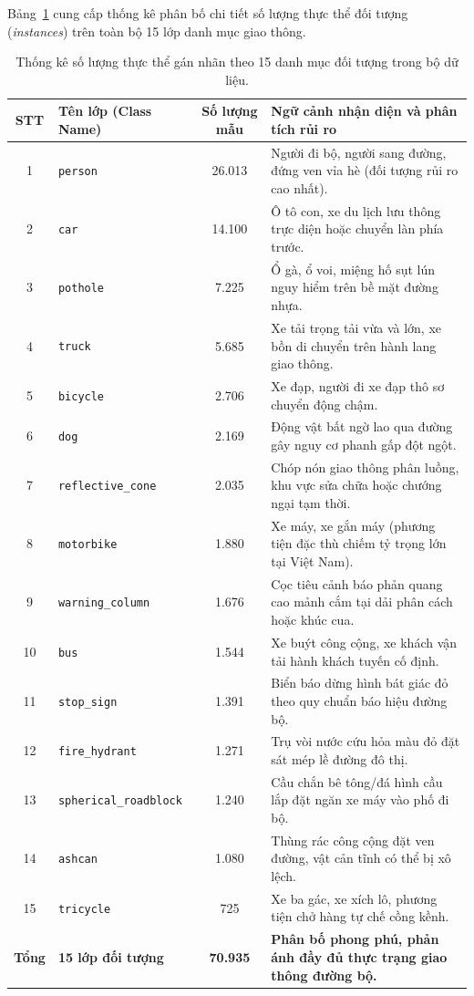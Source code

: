 \documentclass[12pt,a4paper]{article}
\begin{document}
Bảng~\ref{tab:class_instances_distribution} cung cấp thống kê phân bố chi tiết số lượng thực thể đối tượng (\textit{instances}) trên toàn bộ 15 lớp danh mục giao thông.

\begin{table}[htbp]
\centering
\caption{Thống kê số lượng thực thể gán nhãn theo 15 danh mục đối tượng trong bộ dữ liệu.}
\label{tab:class_instances_distribution}
\small
\begin{tabular}{|c|l|c|p{8.0cm}|}
\hline
\textbf{STT} & \textbf{Tên lớp (Class Name)} & \textbf{Số lượng mẫu} & \textbf{Ngữ cảnh nhận diện và phân tích rủi ro} \\ \hline
1 & \texttt{person} & 26.013 & Người đi bộ, người sang đường, đứng ven vỉa hè (đối tượng rủi ro cao nhất). \\ \hline
2 & \texttt{car} & 14.100 & Ô tô con, xe du lịch lưu thông trực diện hoặc chuyển làn phía trước. \\ \hline
3 & \texttt{pothole} & 7.225 & Ổ gà, ổ voi, miệng hố sụt lún nguy hiểm trên bề mặt đường nhựa. \\ \hline
4 & \texttt{truck} & 5.685 & Xe tải trọng tải vừa và lớn, xe bồn di chuyển trên hành lang giao thông. \\ \hline
5 & \texttt{bicycle} & 2.706 & Xe đạp, người đi xe đạp thô sơ chuyển động chậm. \\ \hline
6 & \texttt{dog} & 2.169 & Động vật bất ngờ lao qua đường gây nguy cơ phanh gấp đột ngột. \\ \hline
7 & \texttt{reflective\_cone} & 2.035 & Chóp nón giao thông phân luồng, khu vực sửa chữa hoặc chướng ngại tạm thời. \\ \hline
8 & \texttt{motorbike} & 1.880 & Xe máy, xe gắn máy (phương tiện đặc thù chiếm tỷ trọng lớn tại Việt Nam). \\ \hline
9 & \texttt{warning\_column} & 1.676 & Cọc tiêu cảnh báo phản quang cao mảnh cắm tại dải phân cách hoặc khúc cua. \\ \hline
10 & \texttt{bus} & 1.544 & Xe buýt công cộng, xe khách vận tải hành khách tuyến cố định. \\ \hline
11 & \texttt{stop\_sign} & 1.391 & Biển báo dừng hình bát giác đỏ theo quy chuẩn báo hiệu đường bộ. \\ \hline
12 & \texttt{fire\_hydrant} & 1.271 & Trụ vòi nước cứu hỏa màu đỏ đặt sát mép lề đường đô thị. \\ \hline
13 & \texttt{spherical\_roadblock} & 1.240 & Cầu chắn bê tông/đá hình cầu lắp đặt ngăn xe máy vào phố đi bộ. \\ \hline
14 & \texttt{ashcan} & 1.080 & Thùng rác công cộng đặt ven đường, vật cản tĩnh có thể bị xô lệch. \\ \hline
15 & \texttt{tricycle} & 725 & Xe ba gác, xe xích lô, phương tiện chở hàng tự chế cồng kềnh. \\ \hline
\textbf{Tổng} & \textbf{15 lớp đối tượng} & \textbf{70.935} & \textbf{Phân bố phong phú, phản ánh đầy đủ thực trạng giao thông đường bộ.} \\ \hline
\end{tabular}
\end{table}
\end{document}
